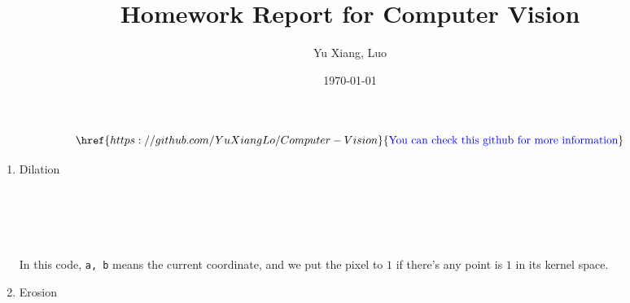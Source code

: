\documentclass[12pt,a4paper]{article}
\title{Homework Report for Computer Vision}
\author{Yu Xiang, Luo}
\date{\today}
\begin{document}
\maketitle

\[
	\href{https://github.com/YuXiangLo/Computer-Vision}{\text{\textcolor{blue}{You can check this github for more information}}}
\]

\begin{enumerate}[label=(\alph*)]
	\item Dilation\\
		\\
		\\
		\\
		\\ \\  
		In this code, \texttt{a, b} means the current coordinate, and we put the pixel to $1$ if there's any point is $1$ in its kernel space.\\
		\newpage
	\item Erosion\\
		\\
		\\

\end{enumerate}
\end{document}
